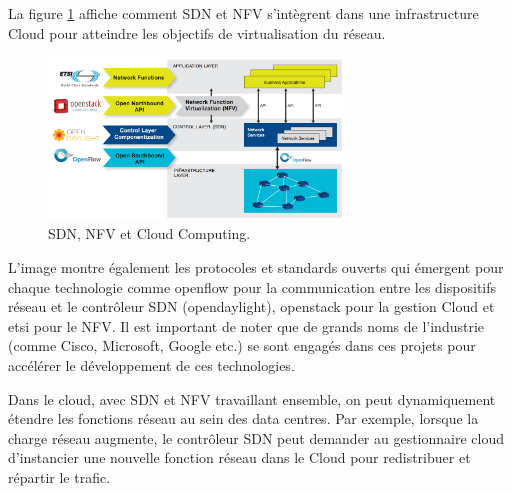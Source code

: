 La figure \ref{cloud-sdn-nfv} affiche comment SDN et NFV s'intègrent dans une infrastructure Cloud pour atteindre les objectifs de virtualisation du réseau. \\

\begin{figure}[h]
\begin{center}
\includegraphics[width=0.7\textwidth]{images/cloud-sdn-nfv} 
\caption{SDN, NFV et Cloud Computing. \cite{OFSDNNFVand}} \label{cloud-sdn-nfv}
\end{center}
\end{figure} 

L'image montre également les protocoles et standards ouverts qui émergent pour chaque technologie comme \gls{openflow} pour la communication entre les dispositifs réseau et le contrôleur SDN (\gls{opendaylight}), \gls{openstack} pour la gestion Cloud et \gls{etsi} pour le NFV. Il est important de noter que de grands noms de l’industrie (comme Cisco, Microsoft, Google etc.) se sont engagés dans ces projets pour accélérer le développement de ces technologies.

Dans le cloud, avec SDN et NFV travaillant ensemble, on peut dynamiquement étendre les fonctions réseau au sein des data centres. Par exemple, lorsque la charge réseau augmente, le contrôleur SDN peut demander au gestionnaire cloud d'instancier une nouvelle fonction réseau dans le Cloud pour redistribuer et répartir le trafic. 

